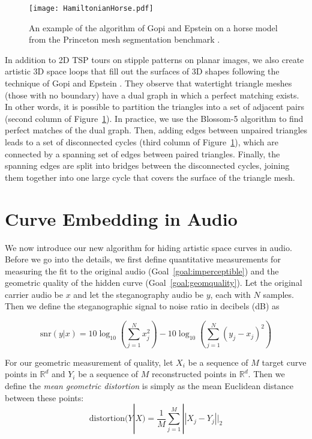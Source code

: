 \documentclass[runningheads]{llncs}
\begin{document}
\begin{figure}
  \centering
  \texttt{[image: HamiltonianHorse.pdf]}
  \caption{An example of the algorithm of Gopi and Epstein \cite{gopi2004single} on a horse model from the Princeton mesh segmentation benchmark \cite{Chen:2009:ABF}.}
  \label{fig:HamiltonianHorse}
\end{figure}

In addition to 2D TSP tours on stipple patterns on planar images, we also create artistic 3D space loops that fill out the surfaces of 3D shapes following the technique of Gopi and Epstein \cite{gopi2004single}.  They observe that watertight triangle meshes (those with no boundary) have a dual graph in which a perfect matching exists.  In other words, it is possible to partition the triangles into a set of adjacent pairs (second column of Figure~\ref{fig:HamiltonianHorse}).  In practice, we use the Blossom-5 algorithm \cite{kolmogorov2009blossom} to find perfect matches of the dual graph.  Then, adding edges between unpaired triangles leads to a set of disconnected cycles (third column of Figure~\ref{fig:HamiltonianHorse}), which are connected by a spanning set of edges between paired triangles.  Finally, the spanning edges are split into bridges between the disconnected cycles, joining them together into one large cycle that covers the surface of the triangle mesh.


\section{Curve Embedding in Audio}
\label{sec:methods}

We now introduce our new algorithm for hiding artistic space curves in audio.  Before we go into the details, we first define quantitative measurements for measuring the fit to the original audio (Goal~\ref{goal:imperceptible}) and the geometric quality of the hidden curve (Goal~\ref{goal:geomquality}).  Let the original carrier audio be $x$ and let the steganography audio be $y$, each with $N$ samples.  Then we define the steganographic signal to noise ratio in decibels (dB) as 

\begin{equation}
  \label{eq:stegsnr}
   \text{snr}(y|x) = 10  \log_{10} \left(\sum_{j=1}^N x_j^2 \right) -  10 \log_{10}\left(\sum_{j=1}^N (y_j-x_j)^2  \right)
\end{equation}

For our geometric measurement of quality, let $X_i$ be a sequence of $M$ target curve points in $\mathbb{R}^d$ and $Y_i$ be a sequence of $M$ reconstructed points in $\mathbb{R}^d$.  Then we define the {\em mean geometric distortion} is simply as the mean Euclidean distance between these points:
\begin{equation}
  \label{eq:distortion}
  \text{distortion}(Y|X) = \frac{1}{M} \sum_{j=1}^M ||X_j - Y_j||_2
\end{equation}
\end{document}
